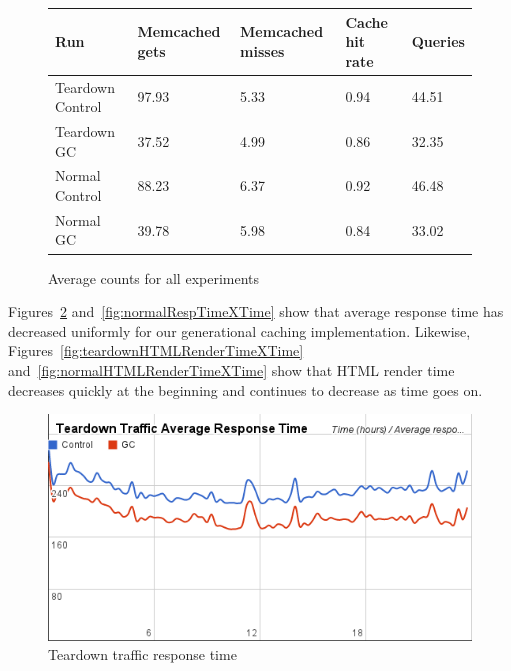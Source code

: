 \documentclass[12pt]{ucthesis}
\begin{document}
\begin{figure}[h]
\begin{center}
\begin{tabular}{| l | l | l | l | l |}
   \hline
   Run & Memcached gets & Memcached misses & Cache hit rate & Queries \\ \hline
   Teardown Control & 97.93 & 5.33 & 0.94 & 44.51 \\ \hline
   Teardown GC & 37.52 & 4.99 & 0.86 & 32.35 \\ \hline
   \hline
   Normal Control & 88.23 & 6.37 & 0.92 & 46.48 \\ \hline
   Normal GC & 39.78 & 5.98 & 0.84 & 33.02 \\
   \hline
\end{tabular}
\end{center}
\caption{Average counts for all experiments}
\label{fig:averageExperimentCounts}
\end{figure}

Figures~\ref{fig:teardownRespTimeXTime} and~\ref{fig:normalRespTimeXTime} show that average response time has decreased uniformly for our generational caching implementation.
Likewise, Figures~\ref{fig:teardownHTMLRenderTimeXTime} and~\ref{fig:normalHTMLRenderTimeXTime} show that HTML render time decreases quickly at the beginning and continues to decrease as time goes on.

\begin{figure}[htp]
\centering
\includegraphics[width=\textwidth]{assets/teardownRespTimeXTime.png}
\caption{Teardown traffic response time}
\label{fig:teardownRespTimeXTime}
\end{figure}
\end{document}
